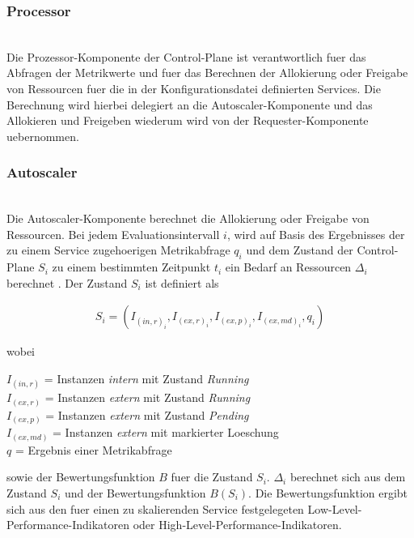 \documentclass[runningheads]{llncs}
\begin{document}
\subsubsection{Processor} \hfill\\

Die Prozessor-Komponente der Control-Plane ist verantwortlich fuer das Abfragen der Metrikwerte und fuer das Berechnen der Allokierung oder Freigabe von Ressourcen fuer die in der Konfigurationsdatei definierten Services. Die Berechnung wird hierbei delegiert an die Autoscaler-Komponente und das Allokieren und Freigeben wiederum wird von der Requester-Komponente uebernommen.
	
\subsubsection{Autoscaler} \hfill\\

Die Autoscaler-Komponente berechnet die Allokierung oder Freigabe von Ressourcen. Bei jedem Evaluationsintervall $i$, wird auf Basis des Ergebnisses der zu einem Service zugehoerigen Metrikabfrage $q_{i}$ und dem Zustand der Control-Plane $S_{i}$ zu einem bestimmten Zeitpunkt $t_{i}$ ein Bedarf an Ressourcen $\Delta _{i}$ berechnet . Der Zustand $S_{i}$ ist definiert als

\begin{gather*}
	S_{i}=\left( I_{(in,r)_{i}}, I_{(ex,r)_{i}}, I_{(ex,p)_{i}},  I_{(ex,md)_{i}} , q_{i} \right)
\end{gather*}

wobei

	$I_{(in,r)}$ = Instanzen \textit{intern} mit Zustand \textit{Running} \\
	$I_{(ex,r)}$ = Instanzen \textit{extern} mit Zustand \textit{Running} \\
	$I_{(ex,p)}$ = Instanzen \textit{extern} mit Zustand \textit{Pending} \\
	$I_{(ex,md)}$ = Instanzen \textit{extern} mit markierter Loeschung \\
	$q$ = Ergebnis einer Metrikabfrage
	
sowie der Bewertungsfunktion  $B$ fuer die Zustand $S_{i}$. $\Delta _{i}$ berechnet sich aus dem Zustand $S_{i}$ und der Bewertungsfunktion $B(S_{i})$. Die Bewertungsfunktion ergibt sich aus den fuer einen zu skalierenden Service festgelegeten Low-Level-Performance-Indikatoren oder High-Level-Performance-Indikatoren. \\
\end{document}
